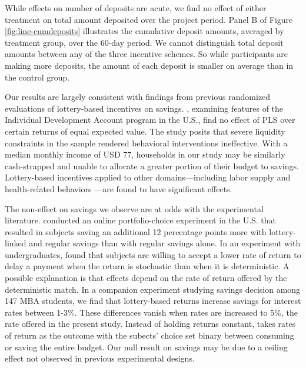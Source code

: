 \documentclass[11pt]{article}
\begin{document}


		While effects on number of deposits are acute, we find no effect of either treatment on total amount deposited over the project period. Panel B of Figure \ref{fig:line-cumdeposits} illustrates the cumulative deposit amounts, averaged by treatment group, over the 60-day period. We cannot distinguish total deposit amounts between any of the three incentive schemes. So while participants are making more deposits, the amount of each deposit is smaller on average than in the control group.

		Our results are largely consistent with findings from previous randomized evaluations of lottery-based incentives on savings. , examining features of the Individual Development Account program in the U.S., find no effect of PLS over certain returns of equal expected value. The study posits that severe liquidity constraints in the sample rendered behavioral interventions ineffective. With a median monthly income of USD 77, households in our study may be similarly cash-strapped and unable to allocate a greater portion of their budget to savings. Lottery-based incentives applied to other domains---including labor supply  and health-related behaviors ---are found to have significant effects.


		The non-effect on savings we observe are at odds with the experimental literature.  conducted an online portfolio-choice experiment in the U.S. that resulted in subjects saving an additional 12 percentage points more with lottery-linked and regular savings than with regular savings alone. In an experiment with undergraduates,  found that subjects are willing to accept a lower rate of return to delay a payment when the return is stochastic than when it is deterministic. A possible explanation is that effects depend on the rate of return offered by the deterministic match. In a companion experiment studying savings decision among 147 MBA students, we find that lottery-based returns increase savings for interest rates between 1-3\%. These differences vanish when rates are increased to 5\%, the rate offered in the present study. Instead of holding returns constant,  takes rates of return as the outcome with the subects' choice set binary between consuming or saving the entire budget. Our null result on savings may be due to a ceiling effect not observed in previous experimental designs.
\end{document}
